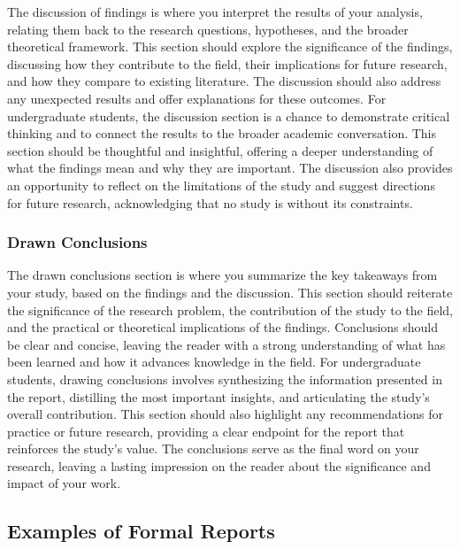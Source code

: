 \documentclass[
]{book}
\begin{document}
The discussion of findings is where you interpret the results of your analysis, relating them back to the research questions, hypotheses, and the broader theoretical framework. This section should explore the significance of the findings, discussing how they contribute to the field, their implications for future research, and how they compare to existing literature. The discussion should also address any unexpected results and offer explanations for these outcomes. For undergraduate students, the discussion section is a chance to demonstrate critical thinking and to connect the results to the broader academic conversation. This section should be thoughtful and insightful, offering a deeper understanding of what the findings mean and why they are important. The discussion also provides an opportunity to reflect on the limitations of the study and suggest directions for future research, acknowledging that no study is without its constraints.

\subsubsection*{Drawn Conclusions}\label{drawn-conclusions}

The drawn conclusions section is where you summarize the key takeaways from your study, based on the findings and the discussion. This section should reiterate the significance of the research problem, the contribution of the study to the field, and the practical or theoretical implications of the findings. Conclusions should be clear and concise, leaving the reader with a strong understanding of what has been learned and how it advances knowledge in the field. For undergraduate students, drawing conclusions involves synthesizing the information presented in the report, distilling the most important insights, and articulating the study's overall contribution. This section should also highlight any recommendations for practice or future research, providing a clear endpoint for the report that reinforces the study's value. The conclusions serve as the final word on your research, leaving a lasting impression on the reader about the significance and impact of your work.

\subsection*{Examples of Formal Reports}\label{examples-of-formal-reports}
\end{document}
